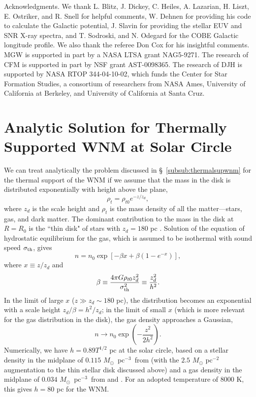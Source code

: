 \documentclass[12pt,preprint,flushrt]{aastex}
\newcommand{\beq}{\begin{equation}}
\newcommand{\eeq}{\end{equation}}
\newcommand{\eee}{$^{-3}$}
\begin{document}
Acknowledgments.  We thank L. Blitz, J. Dickey, C. Heiles,
A. Lazarian, H. Liszt, E. Ostriker, and R. Snell for helpful comments,
W. Dehnen for providing his code to calculate the Galactic
potential, J. Slavin for providing the stellar EUV and
SNR X-ray spectra, and T. Sodroski, and N. Odegard for the COBE Galactic
longitude profile. We also thank the referee Don Cox for his insightful
comments.
MGW is supported in part by a NASA LTSA grant
NAG5-9271.
The research of CFM is supported in part by NSF
grant AST-0098365. The research of DJH is supported by NASA RTOP
344-04-10-02, which funds the Center for Star Formation Studies,
a consortium of researchers from NASA Ames, University of California
at Berkeley, and University of California at Santa Cruz.

\newpage

\appendix

\section{Analytic Solution for Thermally Supported WNM at Solar 
                                     Circle}\label{appen:thermalWNM}

  We can treat analytically the problem discussed 
in \S~\ref{subsub:thermalsupwnm} for the thermal support of the WNM 
if we assume that the
mass in the disk is distributed exponentially with height above
the plane,
\beq
\rho_t=\rho_{t0} e^{-z/z_d},
\eeq
where $z_d$ is the scale height and $\rho_t$ is the mass density of
all the matter---stars, gas, and dark matter.
The dominant contribution to the mass in the disk at $R=R_0$ is the 
``thin disk"
of stars with $z_d=180$ pc \citep{deh98}.
Solution of the
equation of hydrostatic equilibrium for the gas, which is
assumed to be isothermal with sound speed $\sigma_{\rm th}$, gives
\beq
n=n_0\exp\left[-\beta x+\beta(1-e^{-x})\right],
\eeq
where $x\equiv z/z_d$ and
\beq
\beta\equiv\frac{4\pi G\rho_{t0}z_d^2}{\sigma_{\rm th}^2}
        \equiv\frac{z_d^2}{h^2}.
\label{eq:beta}
\eeq
In the limit of large
$x$ ($z\gg z_d\sim 180$ pc), the distribution becomes 
an exponential with a scale height
$z_d/\beta=h^2/z_d$; in the limit
of small $x$ (which is more relevant for
the gas distribution in the disk), the gas density approaches a Gaussian,
\beq
n\rightarrow n_0\exp\left(-\frac{z^2}{2h^2}\right).
\eeq
Numerically, we have $h=0.89 T^{1/2}$ pc at the solar
circle, based on a stellar density in
the midplane of $0.115\,\, M_\odot$~pc\eee\ from \cite{deh98}
(with the $2.5\,\, M_\odot$ pc$^{-2}$ augmentation to the thin stellar
disk discussed above)
and a gas density in the
midplane of $0.034\,\, M_\odot$~pc\eee\ from \cite{dic90} and
\cite{mck90}.  For an adopted temperature of 8000 K, this
gives $h=80$ pc for the WNM.
\end{document}
